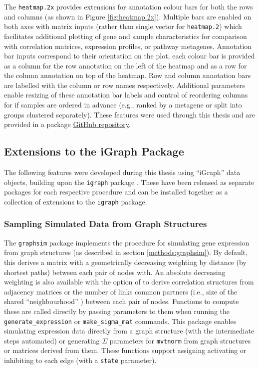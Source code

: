 The \texttt{heatmap.2x} provides extensions for annotation colour bars for both the rows and columns (as shown in Figure \ref{fig:heatmap.2x}). Multiple bars are enabled on both axes with matrix inputs (rather than single vector for \texttt{heatmap.2}) which facilitates additional plotting of gene and sample characteristics for comparison with correlation matrices, expression profiles, or pathway metagenes. Annotation bar inputs correspond to their orientation on the plot, each colour bar is provided as a column for the row annotation on the left of the heatmap and as a row for the column annotation on top of the heatmap. Row and column annotation bars are labelled with the column or row names respectively. Additional parameters enable resizing of these annotation bar labels and control of reordering columns for if samples are ordered in advance (e.g., ranked by a metagene or split into groups clustered separately).  These features were used through this thesis and are provided in a package \href{https://github.com/TomKellyGenetics/heatmap.2x}{GitHub repository}.




\subsection{Extensions to the iGraph Package} \label{methods:igraph_extensions}
The following features were developed during this thesis using ``iGraph'' data objects, building upon the \texttt{igraph} package \citep{igraph}. These have been released as separate packages for each respective procedure and can be installed together as a collection of extensions to the \texttt{igraph} package.

\subsubsection{Sampling Simulated Data from Graph Structures}
The \texttt{graphsim} package implements the procedure for simulating gene expression from graph structures (as described in section \ref{methods:graphsim}). By default, this derives a matrix with a geometrically decreasing weighting by distance (by shortest paths) between each pair of nodes with. An absolute decreasing weighting is also available with the option of to derive correlation structures from adjacency matrices or the number of links common partners (i.e., size of the shared ``neighbourhood'' \citep{Hell1976}) between each pair of nodes. Functions to compute these are called directly by passing parameters to them when running the \texttt{generate\_expression} or \texttt{make\_sigma\_mat} commands. This package enables simulating expression data directly from a graph structure (with the intermediate steps automated) or generating $\Sigma$ parameters for \texttt{mvtnorm} from graph structures or matrices derived from them. These functions support assigning activating or inhibiting to each edge (with a \texttt{state} parameter).

